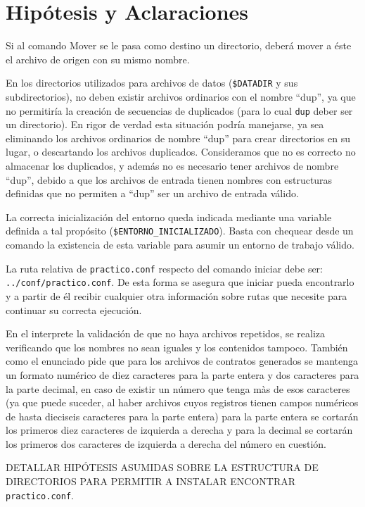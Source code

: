 \documentclass[12pt]{article}
\begin{document}
\tableofcontents
\clearpage

\section{Hipótesis y Aclaraciones}

Si al comando Mover se le pasa como destino un directorio, deberá mover a éste el archivo de origen con su mismo nombre.

En los directorios utilizados para archivos de datos (\verb|$DATADIR| y sus subdirectorios), no deben existir archivos ordinarios con el nombre ``dup'', ya que no permitiría la creación de secuencias de duplicados (para lo cual \verb|dup| deber ser un directorio). 
En rigor de verdad esta situación podría manejarse, ya sea eliminando los archivos ordinarios de nombre ``dup'' para crear directorios en su lugar, o descartando los archivos duplicados. 
Consideramos que no es correcto no almacenar los duplicados, y además no es necesario tener archivos de nombre ``dup'', debido a que los archivos de entrada tienen nombres con estructuras definidas que no permiten a ``dup'' ser un archivo de entrada válido.

La correcta inicialización del entorno queda indicada mediante una variable definida a tal propósito (\verb|$ENTORNO_INICIALIZADO|). Basta con chequear desde un comando la existencia de esta variable para asumir un entorno de trabajo válido.

La ruta relativa de \verb|practico.conf| respecto del comando iniciar debe ser: \verb|../conf/practico.conf|. De esta forma se asegura que iniciar pueda encontrarlo y a partir de él recibir cualquier otra información sobre rutas que necesite para continuar su correcta ejecución.

En el interprete la validación de que no haya archivos repetidos, se realiza verificando que los nombres no sean iguales y los contenidos tampoco. También como el enunciado pide que para los archivos de contratos generados se mantenga un formato numérico de diez caracteres para la parte entera y dos caracteres para la parte decimal, en caso de existir un número que tenga màs de esos caracteres (ya que puede suceder, al haber archivos cuyos registros tienen campos numéricos de hasta dieciseis caracteres para la parte entera) para la parte entera se cortarán los primeros diez caracteres de izquierda a derecha y para la decimal se cortarán los primeros dos caracteres de izquierda a derecha del número en cuestión.

DETALLAR HIPÓTESIS ASUMIDAS SOBRE LA ESTRUCTURA DE DIRECTORIOS PARA PERMITIR A INSTALAR ENCONTRAR \verb|practico.conf|.
\end{document}
